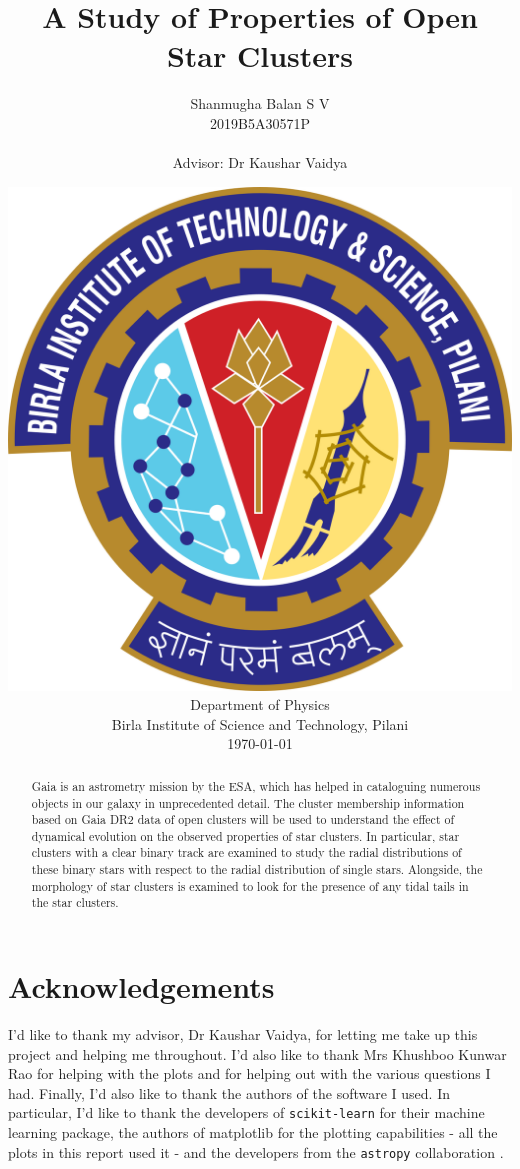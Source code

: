 \documentclass[12pt,a4paper,oneside,openright]{report}
\title{A Study of Properties of Open Star Clusters}
\author{Shanmugha Balan S V \\ 2019B5A30571P \\[1cm]\\{\small Advisor: Dr Kaushar Vaidya}\\[1cm]}
\date{\includegraphics[scale=0.1]{logo} \\ Department of Physics\\ Birla Institute of Science and Technology, Pilani\\[5mm] \today}
\begin{document}
\pagestyle{empty}

\maketitle	
\cleardoublepage

\singlespacing
{}
\pagestyle{plain}
	
\begin{abstract}
Gaia is an astrometry mission by the ESA, which has helped in cataloguing numerous objects in our galaxy in unprecedented detail. The cluster membership information based on Gaia DR2 data of open clusters will be used to understand the effect of dynamical evolution on the observed properties of star clusters. In particular, star clusters with a clear binary track are examined to study the radial distributions of these binary stars with respect to the radial distribution of single stars. Alongside, the morphology of star clusters is examined to look for the presence of any tidal tails in the star clusters. 
\end{abstract}	

\cleardoublepage

\tableofcontents

\cleardoublepage

\pagestyle{fancy}
\singlespacing
{}	






\singlespacing

\chapter*{Acknowledgements}
I'd like to thank my advisor, Dr Kaushar Vaidya, for letting me take up this project and helping me throughout. I'd also like to thank Mrs Khushboo Kunwar Rao for helping with the plots and for helping out with the various questions I had. Finally, I'd also like to thank the authors of the software I used. In particular, I'd like to thank the developers of \lstinline{scikit-learn} \citep{scikit-learn} for their machine learning package, the authors of matplotlib for the plotting capabilities - all the plots in this report used it - and the developers from the \lstinline{astropy} collaboration \citep{astropy}.


\nocite{*}
	

	
\end{document}

